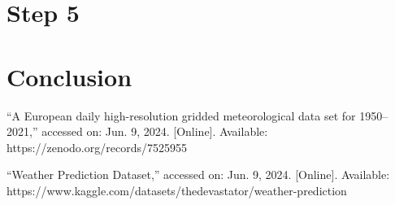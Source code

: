 \documentclass[conference]{IEEEtran}
\begin{document}
\section{Step 5}

\begin{table}[htp]
    \centering
        \caption{Performance comparison of PCA, ICA, and RP with clusters.}
    \label{tab:performance_comparison}
      \resizebox{\columnwidth}{!}{%
    \begin{tabular}{lcccc}
        \toprule
         \textbf{Method} & \textbf{Accuracy} & \textbf{Training Time (s)} & \textbf{Prediction Time (s)} & \textbf{F1-Score Avg} \\
        \midrule
        \textbf{PCA w/ Clusters} & 0.9454 & 3.6799 & 0.00038 & 0.95\\
        \textbf{ICA w/ Clusters} & 0.9369 & 3.55548 & 0.00029 & 0.94\\
        \textbf{RP w/ Clusters} & 0.9300 & 2.15453 & 0.00033 & 0.93\\
        \bottomrule
        
    \end{tabular}%
    }

\end{table}

\section{Conclusion}



\begin{thebibliography}{1}

``A European daily high-resolution gridded meteorological data set for 1950–2021,'' accessed on: Jun. 9, 2024. [Online]. Available: https://zenodo.org/records/7525955

``Weather Prediction Dataset,'' accessed on: Jun. 9, 2024. [Online]. Available: https://www.kaggle.com/datasets/thedevastator/weather-prediction

\end{thebibliography}
\end{document}
